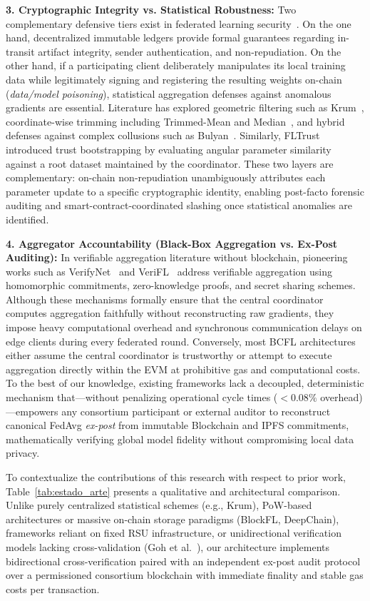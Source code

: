 \textbf{3. Cryptographic Integrity vs. Statistical Robustness:} Two complementary defensive tiers exist in federated learning security~\cite{bouacida2021vulnerabilities, jere2021taxonomy}. On the one hand, decentralized immutable ledgers provide formal guarantees regarding in-transit artifact integrity, sender authentication, and non-repudiation. On the other hand, if a participating client deliberately manipulates its local training data while legitimately signing and registering the resulting weights on-chain (\textit{data/model poisoning}), statistical aggregation defenses against anomalous gradients are essential. Literature has explored geometric filtering such as Krum~\cite{blanchard2017byzantine}, coordinate-wise trimming including Trimmed-Mean and Median~\cite{yin2018byzantine}, and hybrid defenses against complex collusions such as Bulyan~\cite{mhamdi2018hidden}. Similarly, FLTrust~\cite{cao2021fltrust} introduced trust bootstrapping by evaluating angular parameter similarity against a root dataset maintained by the coordinator. These two layers are complementary: on-chain non-repudiation unambiguously attributes each parameter update to a specific cryptographic identity, enabling post-facto forensic auditing and smart-contract-coordinated slashing once statistical anomalies are identified.

\textbf{4. Aggregator Accountability (Black-Box Aggregation vs. Ex-Post Auditing):} In verifiable aggregation literature without blockchain, pioneering works such as VerifyNet~\cite{xu2020verifynet} and VeriFL~\cite{guo2021verifl} address verifiable aggregation using homomorphic commitments, zero-knowledge proofs, and secret sharing schemes. Although these mechanisms formally ensure that the central coordinator computes aggregation faithfully without reconstructing raw gradients, they impose heavy computational overhead and synchronous communication delays on edge clients during every federated round. Conversely, most BCFL architectures either assume the central coordinator is trustworthy or attempt to execute aggregation directly within the EVM at prohibitive gas and computational costs. To the best of our knowledge, existing frameworks lack a decoupled, deterministic mechanism that—without penalizing operational cycle times ($<0.08\%$ overhead)—empowers any consortium participant or external auditor to reconstruct canonical FedAvg \textit{ex-post} from immutable Blockchain and IPFS commitments, mathematically verifying global model fidelity without compromising local data privacy.

To contextualize the contributions of this research with respect to prior work, Table~\ref{tab:estado_arte} presents a qualitative and architectural comparison. Unlike purely centralized statistical schemes (e.g., Krum), PoW-based architectures or massive on-chain storage paradigms (BlockFL, DeepChain), frameworks reliant on fixed RSU infrastructure, or unidirectional verification models lacking cross-validation (Goh et al.~\cite{goh2023blockchain}), our architecture implements bidirectional cross-verification paired with an independent ex-post audit protocol over a permissioned consortium blockchain with immediate finality and stable gas costs per transaction.
